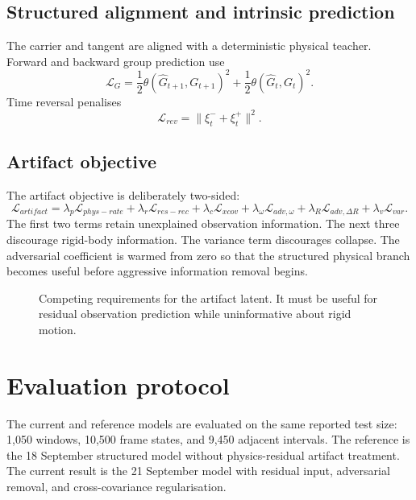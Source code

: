 \documentclass[11pt,a4paper]{article}
\begin{document}
\subsection{Structured alignment and intrinsic prediction}
The carrier and tangent are aligned with a deterministic physical teacher. Forward and backward group prediction use
\begin{equation}
\mathcal L_G=\frac12\theta(\hat G_{t+1},G_{t+1})^2+\frac12\theta(\hat G_t,G_t)^2.
\end{equation}
Time reversal penalises
\begin{equation}
\mathcal L_{rev}=\|\xi_t^-+\xi_t^+\|^2.
\end{equation}

\subsection{Artifact objective}
The artifact objective is deliberately two-sided:
\begin{equation}
\mathcal L_{artifact}=\lambda_p\mathcal L_{phys-rate}+\lambda_r\mathcal L_{res-rec}+\lambda_c\mathcal L_{xcov}+\lambda_\omega\mathcal L_{adv,\omega}+\lambda_R\mathcal L_{adv,\Delta R}+\lambda_v\mathcal L_{var}.
\end{equation}
The first two terms retain unexplained observation information. The next three discourage rigid-body information. The variance term discourages collapse. The adversarial coefficient is warmed from zero so that the structured physical branch becomes useful before aggressive information removal begins.

\begin{figure}[htbp]\centering\caption{Competing requirements for the artifact latent. It must be useful for residual observation prediction while uninformative about rigid motion.}\end{figure}

\section{Evaluation protocol}
The current and reference models are evaluated on the same reported test size: 1,050 windows, 10,500 frame states, and 9,450 adjacent intervals. The reference is the 18 September structured model without physics-residual artifact treatment. The current result is the 21 September model with residual input, adversarial removal, and cross-covariance regularisation.
\end{document}
